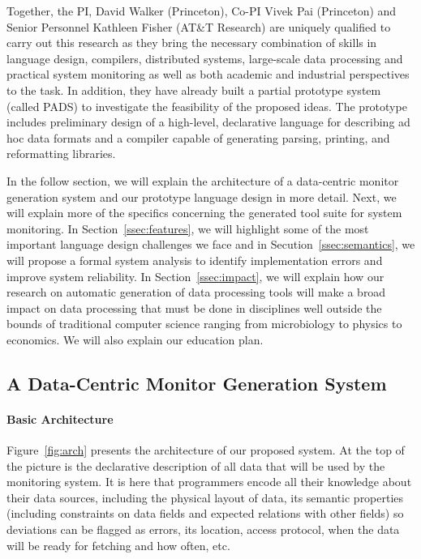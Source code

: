 \documentclass[10pt]{article}
\begin{document}
Together, the PI, David Walker (Princeton), Co-PI Vivek Pai
(Princeton) and Senior Personnel Kathleen Fisher (AT\&T Research) are
uniquely qualified to carry out this research as they bring the
necessary combination of skills in language design, compilers,
distributed systems, large-scale data processing and practical system
monitoring as well as both academic and industrial perspectives to the
task.  In addition, they have already built a partial prototype system
(called PADS) to investigate the feasibility of the proposed ideas.
The prototype includes preliminary design of a high-level, declarative
language for describing ad hoc data formats and a compiler capable of
generating parsing, printing, and reformatting libraries.

In the follow section, we will explain 
the architecture of a data-centric monitor generation system
and our prototype language design in more detail.  
Next, we will explain more of the specifics concerning
the generated tool suite for system monitoring.
In Section~\ref{ssec:features}, we will highlight some of the most
important language design challenges we face and
in Secution~\ref{ssec:semantics}, we will propose a
formal system analysis to identify implementation errors
and improve system reliability.
In Section~\ref{ssec:impact}, we will explain how our research
on automatic generation of data processing tools
will make a broad impact on data processing that must be done
in disciplines well outside the bounds of
traditional computer science ranging from microbiology to physics to
economics.  We will also explain our education plan.

\subsection{A Data-Centric Monitor Generation System}

\paragraph*{Basic Architecture}
Figure~\ref{fig:arch} presents the architecture of our proposed
system.  At the top of the picture is the declarative description of all
data that will be used by the monitoring system.  It is here that
programmers encode all their knowledge about their data sources,
including the physical layout of data, its semantic properties
(including constraints on data fields and expected relations
with other fields) so deviations can be flagged as errors, 
its location, access protocol, when the data
will be ready for fetching and how often, etc.
\end{document}
